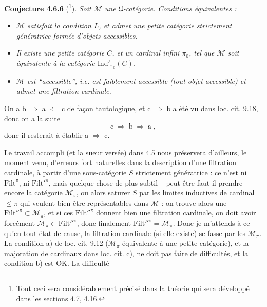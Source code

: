 \documentclass[11pt]{article}
\newcommand{\msp}[1]{\marginpar{\footnotesize [#1]}}
\newcommand{\Mc}{\mathcal{M}}
\newcommand{\U}{\mathfrak{U}}
\begin{document}
\textbf{Conjecture 4.6.6} (\footnote[61]{Tout ceci sera considérablement précisé dans la théorie qui sera développé dans les sections 4.7, 4.16.}). \textit{Soit $\Mc$ une $\U$-catégorie. Conditions équivalentes :} %
\begin{itemize}[leftmargin=4em]
\item[\textit{a)}] \textit{$\Mc$ satisfait la condition $L$, et admet une petite catégorie strictement génératrice formée d'objets accessibles.}
\item[\llap{$\Uparrow$\ }\textit{b)}] \textit{Il existe une petite catégorie $C$, et un cardinal infini $\pi_0$, tel que $\Mc$ soit équivalente à la catégorie $\mathrm{Ind}'_{\pi_0}(C)$.}
\item[\llap{$\Uparrow$\ }\textit{c)}] \textit{$\Mc$ est “accessible”, i.e. est faiblement accessible (tout objet accessible) et admet une filtration cardinale.}
\end{itemize}
On a b $\Longrightarrow$ a $\Longleftarrow$ c de façon tautologique, et c $\Longrightarrow$ b a été vu dans loc. cit. 9.18, donc on a la suite
\[
\mathrm{c} \;\Longrightarrow\; \mathrm{b} \;\Longrightarrow\; \mathrm{a}\;,
\]
donc il resterait à établir a $\Longrightarrow$ c.

\msp{page 155}

Le travail accompli (et la sueur versée) dans 4.5 nous préservera d'ailleurs, le moment venu, d'erreurs fort naturelles dans la description d'une filtration cardinale, à partir d'une sous-catégorie $S$ strictement génératrice : ce n'est ni $\mathrm{Filt}^{\pi}$, ni $\mathrm{Filt}'^{\pi}$, mais quelque chose de plus subtil -- peut-être faut-il prendre encore la catégorie $\Mc_{\pi}$, ou alors saturer $S$ par les limites inductives de cardinal $\leqslant \pi$ qui veulent bien être représentables dans $\Mc$ : on trouve alors une $\mathrm{Filt}''^{\pi} \subset \Mc_{\pi}$, et si ces $\mathrm{Filt}''^{\pi}$ donnent bien une filtration cardinale, on doit avoir forcément $\Mc_{\pi} \subset \mathrm{Filt}''^{\pi}$, donc finalement $\mathrm{Filt}''^{\pi} = \Mc_{\pi}$. Donc je m'attends à ce qu'en tout état de cause, la filtration cardinale (si elle existe) se fasse par les $\Mc_{\pi}$. La condition a) de loc. cit. 9.12 ($\Mc_{\pi}$ équivalente à une petite catégorie), et la majoration de cardinaux dans loc. cit. c), ne doit pas faire de difficultés, et la condition b) est OK. La difficulté
\end{document}
